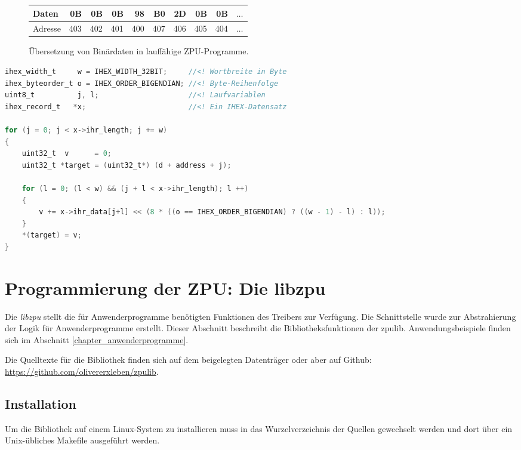 \documentclass[11pt]{scrartcl}
\begin{document}
\begin{figure}
\begin{center}
\begin{tabular}{lrrrrrrrrc}
	\toprule
	Daten   &  0B &  0B &  0B &  98 &  B0 &  2D &  0B &  0B & $\ldots$ \\ \midrule
	Adresse & 403 & 402 & 401 & 400 & 407 & 406 & 405 & 404 & $\ldots$ \\ \bottomrule
\end{tabular}
\end{center}
\caption{Übersetzung von Binärdaten in lauffähige ZPU-Programme.}
\label{zpu_addresses}
\end{figure}

\begin{lstlisting}[float=p,language=C,caption=Algorithmus zum Laden eines Intel HEX-Datensatzes in den ZPU-Speicher,morekeywords={uint8_t, uint32_t, ihex_width_t, ihex_record_t, ihex_byteorder_t},label=ihex_copy_algo]
ihex_width_t     w = IHEX_WIDTH_32BIT;     //<! Wortbreite in Byte
ihex_byteorder_t o = IHEX_ORDER_BIGENDIAN; //<! Byte-Reihenfolge
uint8_t          j, l;                     //<! Laufvariablen
ihex_record_t   *x;                        //<! Ein IHEX-Datensatz

for (j = 0; j < x->ihr_length; j += w)
{
	uint32_t  v      = 0;
	uint32_t *target = (uint32_t*) (d + address + j);
					
	for (l = 0; (l < w) && (j + l < x->ihr_length); l ++)
	{
		v += x->ihr_data[j+l] << (8 * ((o == IHEX_ORDER_BIGENDIAN) ? ((w - 1) - l) : l));
	}
	*(target) = v;
}
\end{lstlisting}

\pagebreak
\section{Programmierung der ZPU: Die libzpu}
\label{chapter_libzpu}
Die \textit{libzpu} stellt die für Anwenderprogramme benötigten Funktionen des Treibers zur Verfügung. Die Schnittstelle wurde zur Abstrahierung der Logik für Anwenderprogramme erstellt. Dieser Abschnitt beschreibt die Bibliotheksfunktionen der zpulib. Anwendungsbeispiele finden sich im Abschnitt \ref{chapter_anwenderprogramme}. 

Die Quelltexte für die Bibliothek finden sich auf dem beigelegten Datenträger oder aber auf Github: \url{https://github.com/olivererxleben/zpulib}. 

\subsection{Installation}
Um die Bibliothek auf einem Linux-System zu installieren muss in das Wurzelverzeichnis der Quellen gewechselt werden und dort über ein Unix-übliches Makefile ausgeführt werden.
\end{document}
